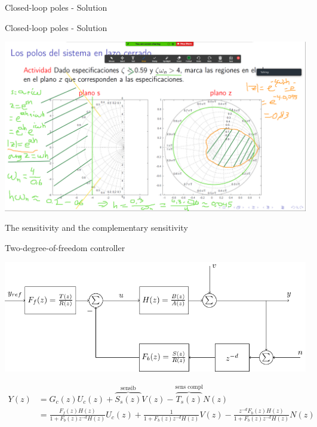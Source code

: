 \documentclass[presentation,aspectratio=169]{beamer}
\begin{document}
\begin{frame}[label={sec:org18f10eb}]{Closed-loop poles - Solution}
\end{frame}
\begin{frame}[label={sec:org6b73f68}]{Closed-loop poles - Solution}
\begin{center}
\includegraphics[height=0.9\textheight]{../../figures/screenshot-2020-07-14.png}
\end{center}
\end{frame}

\begin{frame}[label={sec:org3c64092}]{The sensitivity and the complementary sensitivity}
\end{frame}
\begin{frame}[label={sec:org8ee3c7d}]{Two-degree-of-freedom controller}
\begin{center}
\includegraphics[width=0.8\linewidth]{../../figures/2dof-block-explicit}
\end{center}

\begin{align*}
Y(z) &= G_c(z)U_c(z) + \overbrace{S_s(z)}^{\text{sensib}}V(z) - \overbrace{T_s(z)}^{\text{sens compl}}N(z)\\
     &= \frac{F_f(z)H(z)}{1 + F_b(z)z^{-d}H(z)}U_c(z) + \frac{1}{1 + F_b(z)z^{-d}H(z)}V(z)  - \frac{z^{-d}F_b(z)H(z)}{1 + F_b(z)z^{-d}H(z)}N(z)\\
\end{align*}
\end{frame}
\end{document}
